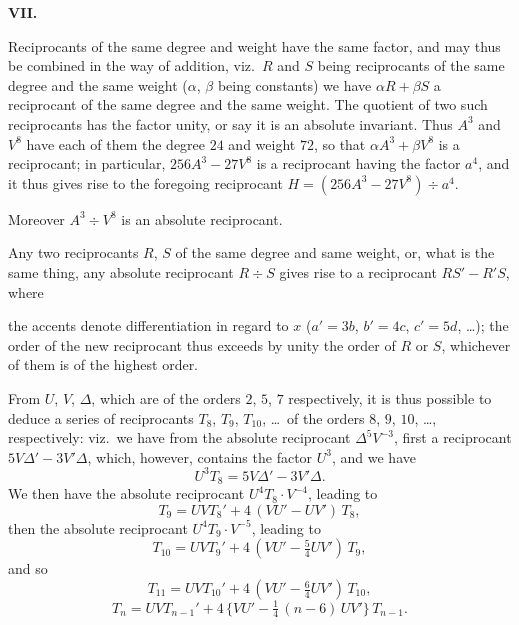 \documentclass[11pt]{article}
\begin{document}
\medskip

\begin{center}\textbf{VII.}\end{center}

Reciprocants of the same degree and weight have the same factor, and may thus be combined in the way of addition, viz.\ $R$ and $S$ being reciprocants of the same degree and the same weight (\(\alpha\), \(\beta\) being constants) we have $\alpha R + \beta S$ a reciprocant of the same degree and the same weight. The quotient of two such reciprocants has the factor unity, or say it is an absolute invariant. Thus $A^3$ and $V^8$ have each of them the degree $24$ and weight $72$, so that $\alpha A^3 + \beta V^8$ is a reciprocant; in particular, $256 A^3 - 27 V^8$ is a reciprocant having the factor $a^4$, and it thus gives rise to the foregoing reciprocant $H = (256 A^3 - 27 V^8) \div a^4$.

Moreover $A^3 \div V^8$ is an absolute reciprocant.

Any two reciprocants $R$, $S$ of the same degree and same weight, or, what is the same thing, any absolute reciprocant $R \div S$ gives rise to a reciprocant $R S' - R' S$, where

the accents denote differentiation in regard to $x$ ($a' = 3 b$, $b' = 4 c$, $c' = 5 d$, \ldots); the order of the new reciprocant thus exceeds by unity the order of $R$ or $S$, whichever of them is of the highest order.

From $U$, $V$, $\Delta$, which are of the orders $2$, $5$, $7$ respectively, it is thus possible to deduce a series of reciprocants $T_8$, $T_9$, $T_{10}$, \ldots\ of the orders $8$, $9$, $10$, \ldots, respectively: viz.\ we have from the absolute reciprocant $\Delta^5 V^{-3}$, first a reciprocant $5 V \Delta' - 3 V' \Delta$, which, however, contains the factor $U^3$, and we have
\[
U^3 T_8 = 5 V \Delta' - 3 V' \Delta.
\]
We then have the absolute reciprocant $U^4 T_8 \cdot V^{-4}$, leading to
\[
T_9 = U V T_8' + 4\,(V U' - U V')\,T_8,
\]
then the absolute reciprocant $U^4 T_9 \cdot V^{-5}$, leading to
\[
T_{10} = U V T_9' + 4\,(V U' - \tfrac{5}{4} U V')\,T_9,
\]
and so
\[
T_{11} = U V T_{10}' + 4\,(V U' - \tfrac{6}{4} U V')\,T_{10},
\]
\[
T_n = U V T_{n-1}' + 4\,\{V U' - \tfrac{1}{4}\,(n - 6)\,U V'\}\,T_{n-1}.
\]
\end{document}

